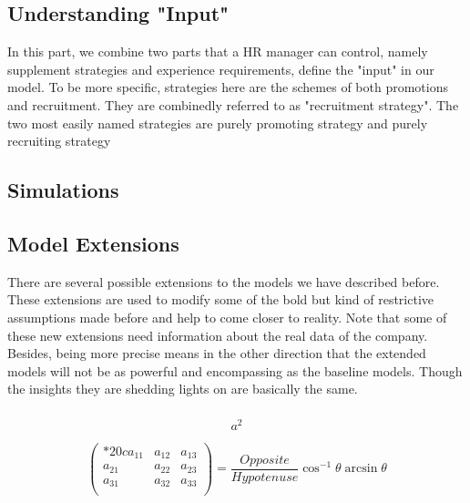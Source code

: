 \documentclass[tcn = 37075, sheet = true, abstract = true]{mcmthesis}
\begin{document}
\subsection{Understanding "Input"}

In this part, we combine two parts that a HR manager can control, namely supplement strategies and experience requirements, define the "input" in our model. To be more specific,  strategies here are the schemes of both promotions and recruitment. They are combinedly referred to as "recruitment strategy". The two most easily named strategies are purely promoting strategy and purely recruiting strategy

\subsection{Simulations}



\subsection{Model Extensions}

There are several possible extensions to the models we have described before. These extensions are used to modify some of the bold but kind of restrictive assumptions made before and help to come closer to reality. Note that some of these new extensions need information about the real data of the company. Besides, being more precise means in the other direction that the extended models will not be as powerful and encompassing as the baseline models. Though the insights they are shedding lights on are basically the same.

\subsubsection{}


\begin{equation}
a^2 \label{aa}
\end{equation}

\[
  \begin{pmatrix}{*{20}c}
  {a_{11} } & {a_{12} } & {a_{13} }  \\
  {a_{21} } & {a_{22} } & {a_{23} }  \\
  {a_{31} } & {a_{32} } & {a_{33} }  \\
  \end{pmatrix}
  = \frac{{Opposite}}{{Hypotenuse}}\cos ^{ - 1} \theta \arcsin \theta
\]
\lipsum[9]
\end{document}
